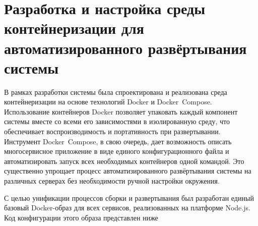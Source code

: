 \chapter{Разработка и настройка среды контейнеризации для автоматизированного развёртывания системы}

	В рамках разработки системы была спроектирована и реализована среда контейнеризации на основе технологий Docker и Docker Compose. Использование контейнеров Docker позволяет упаковать каждый компонент системы вместе со всеми его зависимостями в изолированную среду, что обеспечивает воспроизводимость и портативность при развертывании. Инструмент Docker Compose, в свою очередь, дает возможность описать многосервисное приложение в виде единого конфигурационного файла и автоматизировать запуск всех необходимых контейнеров одной командой. Это существенно упрощает процесс автоматизированного развёртывания системы на различных серверах без необходимости ручной настройки окружения.

	С целью унификации процессов сборки и развертывания был разработан единый базовый Docker-образ для всех сервисов, реализованных на платформе Node.js. Код конфигурации этого образа представлен ниже